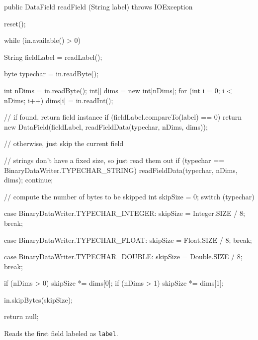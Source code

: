 \begin{code}

   public DataField readField (String label) throws IOException \begin{hide} {

      reset();
      
      while (in.available() > 0) {
         
         String fieldLabel = readLabel();

         byte typechar = in.readByte();

         int nDims = in.readByte();
         int[] dims = new int[nDims];
         for (int i = 0; i < nDims; i++)
            dims[i] = in.readInt();

         // if found, return field instance
         if (fieldLabel.compareTo(label) == 0)
            return new DataField(fieldLabel, readFieldData(typechar, nDims, dims));

         // otherwise, just skip the current field
         
         // strings don't have a fixed size, so just read them out
         if (typechar == BinaryDataWriter.TYPECHAR_STRING) {
            readFieldData(typechar, nDims, dims);
            continue;
         }
         
         // compute the number of bytes to be skipped
         int skipSize = 0;
         switch (typechar) {
            
            case BinaryDataWriter.TYPECHAR_INTEGER:
               skipSize = Integer.SIZE / 8;
               break;
               
            case BinaryDataWriter.TYPECHAR_FLOAT:
               skipSize = Float.SIZE / 8;
               break;
               
            case BinaryDataWriter.TYPECHAR_DOUBLE:
               skipSize = Double.SIZE / 8;
               break;
         }
         
         if (nDims > 0)
            skipSize *= dims[0];
         if (nDims > 1)
            skipSize *= dims[1];
         
         in.skipBytes(skipSize);
      }
      
      return null;
   }
   \end{hide}
\end{code}
\begin{tabb}
Reads the first field labeled as \texttt{label}.
\end{tabb}
\begin{htmlonly}
\end{htmlonly}

